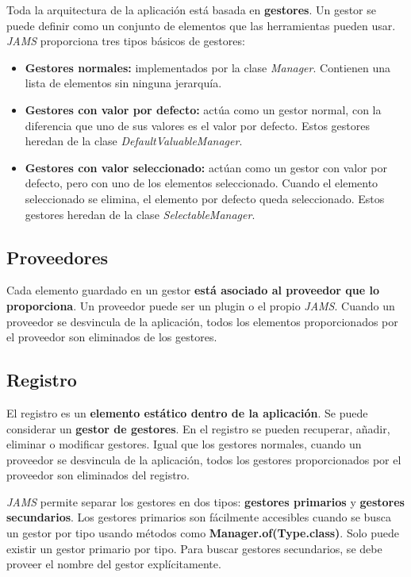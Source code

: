 Toda la arquitectura de la aplicación está basada en \textbf{gestores}.
Un gestor se puede definir como un conjunto de elementos que las herramientas pueden usar.
\textit{JAMS} proporciona tres tipos básicos de gestores:
\begin{itemize}
    \item \textbf{Gestores normales:} implementados por la clase \textit{Manager}.
    Contienen una lista de elementos sin ninguna jerarquía.
    \item \textbf{Gestores con valor por defecto:} actúa como un gestor normal, con la
    diferencia que uno de sus valores es el valor por defecto.
    Estos gestores heredan de la clase \textit{DefaultValuableManager}.
    \item \textbf{Gestores con valor seleccionado:} actúan como un gestor con valor por defecto,
    pero con uno de los elementos seleccionado.
    Cuando el elemento seleccionado se elimina, el elemento por defecto queda seleccionado.
    Estos gestores heredan de la clase \textit{SelectableManager}.
\end{itemize}

\subsection{Proveedores}\label{subsec:proveedores}

Cada elemento guardado en un gestor \textbf{está asociado al proveedor que lo proporciona}.
Un proveedor puede ser un plugin o el propio \textit{JAMS}.
Cuando un proveedor se desvincula de la aplicación, todos los elementos proporcionados
por el proveedor son eliminados de los gestores.

\subsection{Registro}\label{subsec:registro}

El registro es un \textbf{elemento estático dentro de la aplicación}.
Se puede considerar un \textbf{gestor de gestores}.
En el registro se pueden recuperar, añadir, eliminar o modificar gestores.
Igual que los gestores normales, cuando un proveedor se desvincula de la aplicación,
todos los gestores proporcionados por el proveedor son eliminados del registro.

\noindent \textit{JAMS} permite separar los gestores en dos tipos:
\textbf{gestores primarios} y \textbf{gestores secundarios}.
Los gestores primarios son fácilmente accesibles cuando se busca un gestor por tipo
usando métodos como \textbf{Manager.of(Type.class)}.
Solo puede existir un gestor primario por tipo.
Para buscar gestores secundarios, se debe proveer el nombre del gestor explícitamente.

